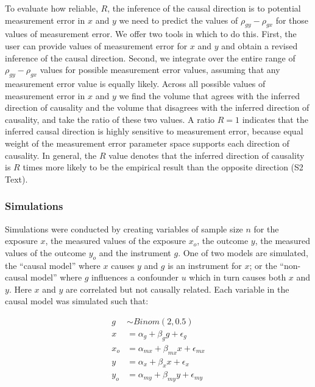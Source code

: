 \documentclass[]{article}
\begin{document}
To evaluate how reliable, \(R\), the inference of the causal direction
is to potential measurement error in \(x\) and \(y\) we need to predict
the values of \(\rho_{gy} - \rho_{gx}\) for those values of measurement
error. We offer two tools in which to do this. First, the user can
provide values of measurement error for \(x\) and \(y\) and obtain a
revised inference of the causal direction. Second, we integrate over the
entire range of \(\rho_{gy} - \rho_{gx}\) values for possible
measurement error values, assuming that any measurement error value is
equally likely. Across all possible values of measurement error in \(x\)
and \(y\) we find the volume that agrees with the inferred direction of
causality and the volume that disagrees with the inferred direction of
causality, and take the ratio of these two values. A ratio \(R=1\)
indicates that the inferred causal direction is highly sensitive to
measurement error, because equal weight of the measurement error
parameter space supports each direction of causality. In general, the
\(R\) value denotes that the inferred direction of causality is \(R\)
times more likely to be the empirical result than the opposite direction
(S2 Text).

\hypertarget{simulations}{%
\subsubsection{Simulations}\label{simulations}}

Simulations were conducted by creating variables of sample size \(n\)
for the exposure \(x\), the measured values of the exposure \(x_o\), the
outcome \(y\), the measured values of the outcome \(y_o\) and the
instrument \(g\). One of two models are simulated, the ``causal model''
where \(x\) causes \(y\) and \(g\) is an instrument for \(x\); or the
``non-causal model'' where \(g\) influences a confounder \(u\) which in
turn causes both \(x\) and \(y\). Here \(x\) and \(y\) are correlated
but not causally related. Each variable in the causal model was
simulated such that:

\[
\begin{aligned}
g & \sim Binom(2, 0.5) \\
x & = \alpha_g + \beta_g g + \epsilon_g \\
x_o & = \alpha_{mx} + \beta_{mx} x + \epsilon_{mx} \\
y & = \alpha_x + \beta_x x + \epsilon_x \\
y_o & = \alpha_{my} + \beta_{my} y + \epsilon_{my} \\
\end{aligned}
\]
\end{document}
